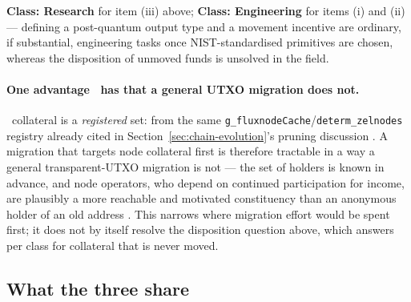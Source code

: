 \begin{remark}
\end{remark}

\textbf{Class: Research} for item (iii) above; \textbf{Class: Engineering} for items (i) and (ii) —
defining a post-quantum output type and a movement incentive are ordinary, if substantial, engineering
tasks once NIST-standardised primitives are chosen, whereas the disposition of unmoved funds is
unsolved in the field.

\paragraph{One advantage \Flux\ has that a general UTXO migration does not.} \FluxNode\ collateral
is a \emph{registered} set:  from the
same \texttt{g\_fluxnode\allowbreak{}Cache}\slash\texttt{determ\_zelnodes} registry already cited in
Section~\ref{sec:chain-evolution}'s pruning discussion
. A migration that targets node collateral
first is therefore tractable in a way a general transparent-UTXO migration is not — the set of
holders is known in advance, and node operators, who depend on continued participation for income, are
plausibly a more reachable and motivated constituency than an anonymous holder of an old address
\srcinferred. This narrows where migration effort would be spent first; it does not by itself resolve the
disposition question above, which  answers per class for collateral that is never moved.

\subsection{What the three share}

